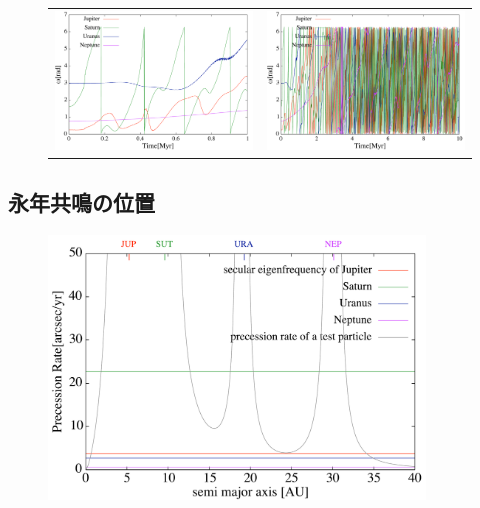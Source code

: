 \documentclass[11pt,a4paper,oneside,onecolumn]{jarticle}
\begin{document}
\begin{figure}[H]
\begin{tabular}{cc}
\begin{minipage}[t]{0.45\hsize}
\centering
\includegraphics[width=7.6cm]{./image/move500kyr_smallomega_1Myr.pdf}
\end{minipage} &
\begin{minipage}[t]{0.45\hsize}
\centering
\includegraphics[width=7.6cm]{./image/move500kyr_smallomega_10Myr.pdf}
\end{minipage}
%
\end{tabular}
\caption{\label{}}
\end{figure}

\subsection{永年共鳴の位置}

\begin{figure}[H]
\centering
\includegraphics[width=10cm]{./image/PrecessionRate_A.pdf}
\caption{\label{}}
\end{figure}
\end{document}

